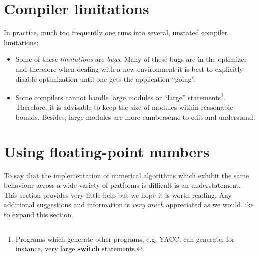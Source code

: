 \section{Compiler limitations}

In practice, much too frequently one runs into several, unstated
 compiler limitations:

\begin{itemize}

\item Some of these {\em limitations} are {\em bugs}. Many of these bugs
 are in the optimizer and therefore when dealing with a new environment it is
 best to explicitly disable optimization until one gets the application ``going''.

\item Some compilers cannot handle large modules or ``large''
   statements\footnote{Programs which generate other programs, e.g. YACC, can
   generate, for instance, very large {\bf switch} statements.}. Therefore,
   it is advisable to keep the size of modules within reasonable bounds.
   Besides, large modules are more cumbersome to edit and understand.

\end{itemize}


\section{Using floating-point numbers}

To say that the implementation of numerical algorithms
 which exhibit the same behaviour across a wide variety of platforms is
difficult is an understatement. This section provides very little
help but we hope it is worth reading. Any additional suggestions
and information is {\em very much} appreciated as we would like
to expand this section.

